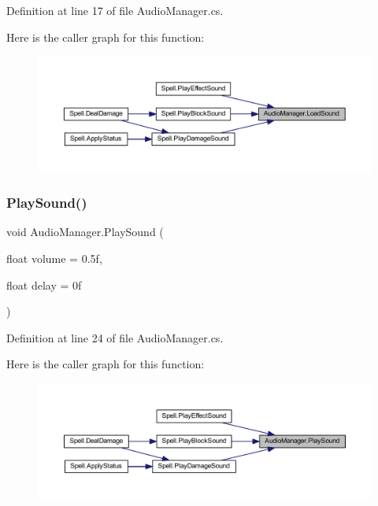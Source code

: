 Definition at line 17 of file Audio\+Manager.\+cs.

Here is the caller graph for this function\+:
\nopagebreak
\begin{figure}[H]
\begin{center}
\leavevmode
\includegraphics[width=350pt]{class_audio_manager_a1520faf231d9b58d63a794f6b8040b99_icgraph}
\end{center}
\end{figure}
\mbox{\label{class_audio_manager_ac0f0dc189806848c224581b363b87396}} 
\subsubsection{\texorpdfstring{PlaySound()}{PlaySound()}}
{\footnotesize\ttfamily void Audio\+Manager.\+Play\+Sound (\begin{DoxyParamCaption}\item[{float}]{volume = {\ttfamily 0.5f},  }\item[{float}]{delay = {\ttfamily 0f} }\end{DoxyParamCaption})}



Definition at line 24 of file Audio\+Manager.\+cs.

Here is the caller graph for this function\+:
\nopagebreak
\begin{figure}[H]
\begin{center}
\leavevmode
\includegraphics[width=350pt]{class_audio_manager_ac0f0dc189806848c224581b363b87396_icgraph}
\end{center}
\end{figure}


